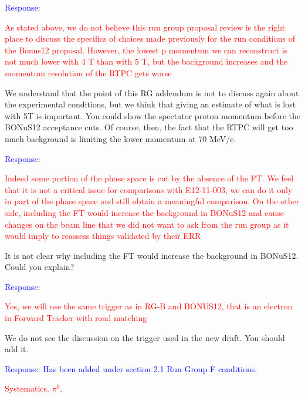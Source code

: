 \begin{itemize}
  \textcolor{blue}{Response: }
  
       
 \textcolor{red}{
 \item As stated above, we do not believe this run group proposal review is the 
    right place to discuss the specifics of choices made previously for the run 
       conditions of the Bonus12 proposal. However, the lowest p momentum we 
       can reconstruct is not much lower with 4 T than with 5 T, but the 
       background increases and the momentum resolution of the RTPC gets worse}
\newline

We understand that the point of this RG addendum is not to discuss again about 
       the experimental conditions, but we think that giving an estimate of 
       what is lost with 5T is important. You could show the spectator proton 
       momentum before the BONuS12 acceptance cuts. Of course, then, the fact 
       that the RTPC will get too much background is limiting the lower 
       momentum at 70 MeV/c.

  
       \textcolor{blue}{Response: }

\textcolor{red}{
\item Indeed some portion
of the phase space is cut by the absence of the FT. We feel that it is not a critical issue
for comparisons with E12-11-003, we can do it only in part of the phase space and still
obtain a meaningful comparison. On the other side, including the FT would increase
the background in BONuS12 and cause changes on the beam line that we did not want
to ask from the run group as it would imply to reassess things validated by their ERR
}
 \newline

It is not clear why including the FT would increase the background in BONuS12.  
Could you explain?
  
  \textcolor{blue}{Response: }
 



\textcolor{red}{
 \item Yes, we will use the same trigger as in RG-B and BONUS12, that is an 
    electron in Forward Tracker with road matching  }
 \newline
We do not see the discussion on the trigger used in the new draft. You should 
add it.


  \textcolor{blue}{Response: Has been added under section 2.1 Run Group F 
  conditions.}


  \textcolor{red}{
  \item Systematics. $\pi^0$.  }
  \newline
 

\end{itemize}
